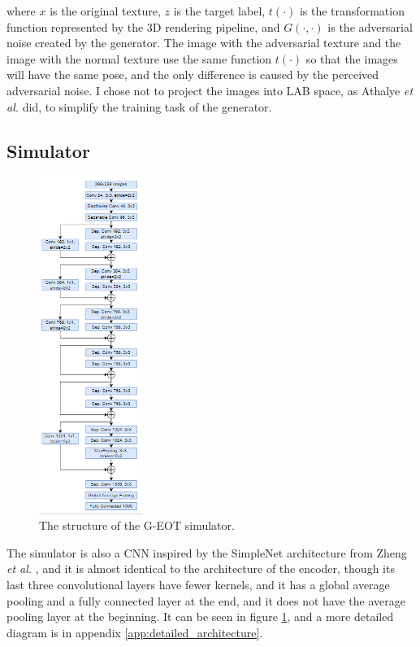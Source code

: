 \noindent where $x$ is the original texture, $z$ is the target label, $t(\cdot)$ is the transformation function represented by the 3D rendering pipeline, and $G(\cdot, \cdot)$ is the adversarial noise created by the generator. The image with the adversarial texture and the image with the normal texture use the same function $t(\cdot)$ so that the images will have the same pose, and the only difference is caused by the perceived adversarial noise. I chose not to project the images into LAB space, as Athalye \textit{et al.} did, to simplify the training task of the generator.

\subsection{Simulator}

\begin{figure}
    \centering
    \includegraphics[width=0.3\textwidth]{graphics/g_eot_simulator.PNG}
    \caption{The structure of the G-EOT simulator.}
    \label{fig:proposed_simulator}
\end{figure}

The simulator is also a CNN inspired by the SimpleNet architecture from Zheng \textit{et al.} \cite{zheng_black_box_GAN}, and it is almost identical to the architecture of the encoder, though its last three convolutional layers have fewer kernels, and it has a global average pooling and a fully connected layer at the end, and it does not have the average pooling layer at the beginning. It can be seen in figure \ref{fig:proposed_simulator}, and a more detailed diagram is in appendix \ref{app:detailed_architecture}.

